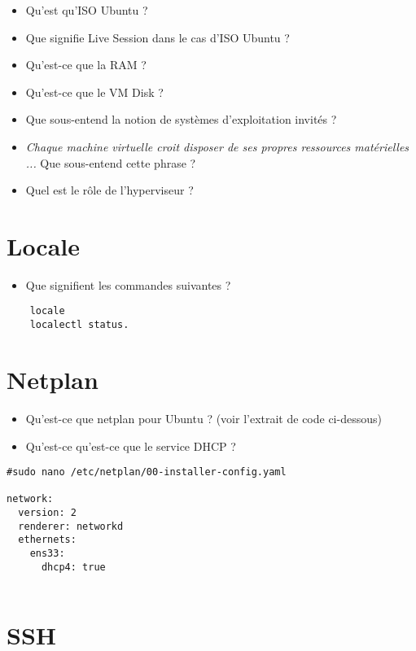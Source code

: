 \documentclass[12pt, letterpaper]{article}
\begin{document}
\begin{itemize}
    \item Qu'est qu'ISO Ubuntu ?
    \item Que signifie Live Session dans le cas d'ISO Ubuntu ?
    \item Qu'est-ce que la RAM ?
    \item Qu'est-ce que le VM Disk ?
    \item Que sous-entend la notion de systèmes d'exploitation invités ?
    \item \textit{Chaque machine virtuelle croit disposer de ses propres ressources matérielles ...} Que sous-entend cette phrase ?
    \item Quel est le rôle de l'hyperviseur ?
\end{itemize}


\section{Locale}

\begin{itemize}
    \item Que signifient les commandes suivantes ?
\end{itemize}
\begin{verbatim}
    locale
    localectl status.
\end{verbatim}

\section{Netplan}

\begin{itemize}
    \item Qu'est-ce que netplan pour Ubuntu ? (voir l'extrait de code ci-dessous)
    \item Qu'est-ce qu'est-ce que le service DHCP ?
\end{itemize}

\begin{verbatim}
#sudo nano /etc/netplan/00-installer-config.yaml

network:
  version: 2
  renderer: networkd
  ethernets:
    ens33:
      dhcp4: true
    
\end{verbatim}


\section{SSH}
\end{document}
